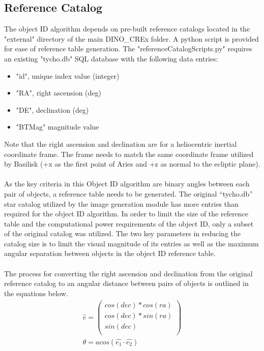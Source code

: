 \documentclass[]{DINOReportMemo}
\begin{document}
\subsection{Reference Catalog} The object ID algorithm depends on pre-built reference catalogs located in the "external" directory of the main DINO\_CREx folder. A python script is provided for ease of reference table generation. The "referenceCatalogScripts.py" requires an existing "tycho.db" SQL database with the following data entries:
\begin{itemize}
	\item "id", unique index value (integer)
	\item "RA", right ascension (deg)
	\item "DE", declination (deg)
	\item "BTMag" magnitude value
	\\	
\end{itemize}	
Note that the right ascension and declination are for a heliocentric inertial coordinate frame. The frame needs to match the same coordinate frame utilized by Basilisk (+x as the first point of Aries and +z as normal to the ecliptic plane). \\ \\
\noindent As the key criteria in this Object ID algorithm are binary angles between each pair of objects, a reference table needs to be generated. The original ``tycho.db'' star catalog utilized by the image generation module has more entries than required for the object ID algorithm. In order to limit the size of the reference table and the computational power requirements of the object ID, only a subset of the original catalog was utilized. The two key parameters in reducing the catalog size is to limit the visual magnitude of its entries as well as the maximum angular separation between objects in the object ID reference table. \\
\\The process for converting the right ascension and declination from the original reference catalog to an angular distance between pairs of objects is outlined in the equations below. \\
\begin{subequations}
	\begin{align}
		\hat{e} = \begin{pmatrix}
					cos(dec)*cos(ra) \\
					cos(dec)*sin(ra) \\
					sin(dec) \\
				\end{pmatrix} \\
		\theta = acos(\hat{e_1} \cdot \hat{e_2})
	\end{align}
\end{subequations}
\end{document}
